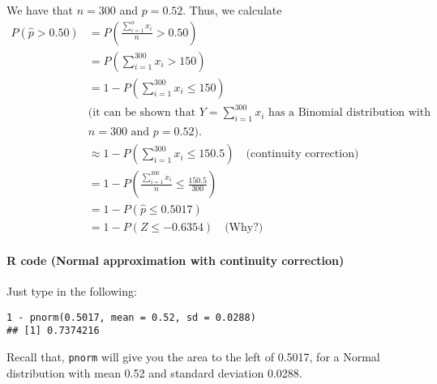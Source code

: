 We have that $n = 300$ and $p = 0.52$.
Thus, we calculate
\begin{align*}
P(\hat{p} > 0.50) &= P\left( \frac{\sum_{i=1}^{n} x_i}{n} > 0.50 \right) \\
&= P\left( \sum_{i=1}^{300} x_i > 150 \right) \\
&= 1 - P\left( \sum_{i=1}^{300} x_i \leq 150 \right) \\
&\text{(it can be shown that } Y = \sum_{i=1}^{300} x_i \text{ has a Binomial distribution with} \\
&n = 300 \text{ and } p = 0.52\text{)}. \\
&\approx 1 - P\left( \sum_{i=1}^{300} x_i \leq 150.5 \right) \quad \text{(continuity correction)} \\
&= 1 - P\left( \frac{\sum_{i=1}^{300} x_i}{n} \leq \frac{150.5}{300} \right) \\
&= 1 - P(\hat{p} \leq 0.5017) \\
&= 1 - P\left( Z \leq -0.6354 \right) \quad \text{(Why?)}
\end{align*}
\paragraph*{R code (Normal approximation with continuity correction)}

Just type in the following:

\begin{verbatim}
1 - pnorm(0.5017, mean = 0.52, sd = 0.0288)
## [1] 0.7374216
\end{verbatim}

Recall that, \texttt{pnorm} will give you the area to the left of 0.5017, for a Normal distribution with mean 0.52 and standard deviation 0.0288.





